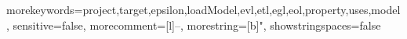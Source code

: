 {morekeywords={project,target,epsilon,loadModel,evl,etl,egl,eol,property,uses,model},
sensitive=false,
morecomment=[l]{--},
morestring=[b]",
showstringspaces=false
}
